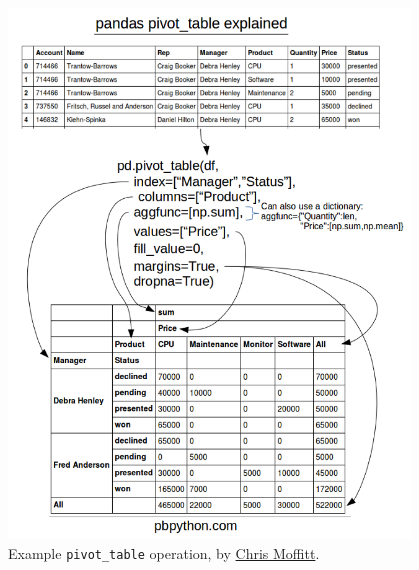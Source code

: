\begin{figure}[H]
\centering
\includegraphics[width=0.95\textwidth]{figures/pandas/pivot-table-datasheet.png}
\caption{
Example \pandas \texttt{pivot\_table} operation, by \href{http://pbpython.com/pandas-pivot-table-explained.html}{Chris Moffitt}.
}
\label{fig:pandas:pivot_table}
\end{figure}
